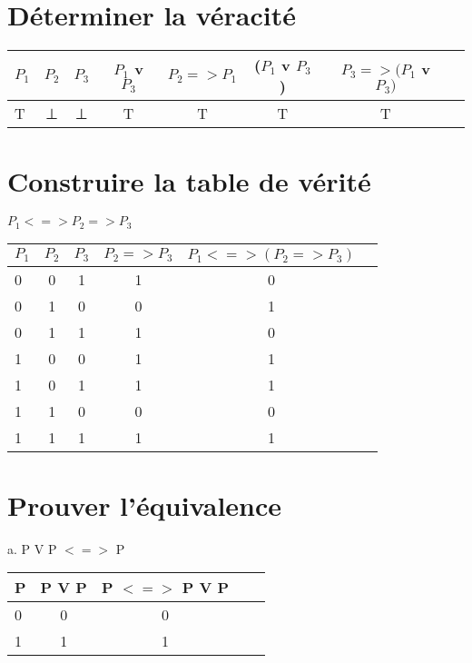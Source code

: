 \newpage
\section{Déterminer la véracité}

\begin{tabular}{|l|c|c|c|c|c|c|c|}
  \hline
  $P_1$ & $P_2$ & $P_3$ & $P_1$ v $P_3$ & $P_2 => P_1$ & ($P_1$ v $P_3$) & $P_3 => (P_1$ v $P_3)$ \\
  \hline
  T & ⊥ & ⊥ & T & T & T & T \\
  \hline
\end{tabular}


\section{Construire la table de vérité}
\vspace{5mm} %

$P_1 <=> P_2 => P_3$ \\

\begin{tabular}{|l|c|c|c|c|c|}
  \hline
  $P_1$ & $P_2$ & $P_3$ & $P_2 => P_3$ & $P_1 <=> (P_2 => P_3)$ \\
  \hline
  0 & 0 & 1 & 1 & 0 \\
  \hline
  0 & 1 & 0 & 0 & 1 \\
  \hline
  0 & 1 & 1 & 1 & 0 \\
  \hline
  1 & 0 & 0 & 1 & 1 \\
  \hline
  1 & 0 & 1 & 1 & 1 \\
  \hline
  1 & 1 & 0 & 0 & 0 \\
  \hline
  1 & 1 & 1 & 1 & 1 \\
  \hline
\end{tabular}

\section{Prouver l'équivalence}

\vspace{3mm} %
a. P V P $<=>$ P \\

\begin{tabular}{|l|c|c|c|c|}
  \hline
  P & P V P & P $<=>$ P V P \\
  \hline
  0 & 0 & 0 \\
  \hline
  1 & 1 & 1 \\
  \hline
\end{tabular}

